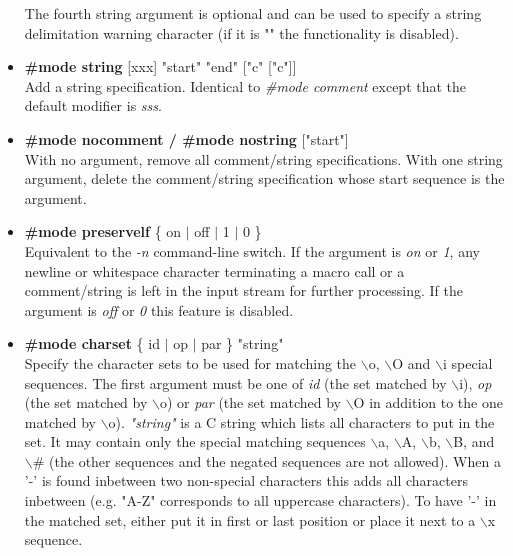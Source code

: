 \begin{itemize}
The fourth string argument is optional and can be used to specify a
string delimitation warning character (if it is "" the functionality is
disabled).
\item
{\bf \#mode string } [xxx] "start" "end" ["c" ["c"]]\\
Add a string specification. Identical to {\it \#mode comment} except that
the default modifier is {\it sss}.
\item
{\bf \#mode nocomment / \#mode nostring } ["start"]\\
With no argument, remove all comment/string specifications. With one
string argument, delete the comment/string specification whose start
sequence is the argument.
\item
{\bf \#mode preservelf } \{ on $|$ off $|$ 1 $|$ 0 \}\\
Equivalent to the {\it -n} command-line switch. If the argument is {\it on}
or {\it 1}, any newline or whitespace character terminating a macro call or 
a comment/string is left in the input stream for further processing. If the
argument is {\it off} or {\it 0} this feature is disabled.
\item
{\bf \#mode charset } \{ id $|$ op $|$ par \} "string"\\
Specify the character sets to be used for matching the $\backslash$o, $\backslash$O and
$\backslash$i special sequences. The first argument must be one of {\it id}
(the set matched by $\backslash$i), {\it op} (the set matched by $\backslash$o) or {\it par}
(the set matched by $\backslash$O in addition to the one matched by $\backslash$o).
{\it "string"} is a C string which lists all characters to put in the set.
It may contain only the special matching sequences $\backslash$a, $\backslash$A, $\backslash$b, $\backslash$B, 
and $\backslash$\# (the other sequences and the negated sequences are not allowed). 
When a '-' is found inbetween two non-special characters this adds all 
characters inbetween (e.g. "A-Z" corresponds to all uppercase characters). 
To have '-' in the matched set, either put it in first or last position
or place it next to a $\backslash$x sequence.
\end{itemize}
